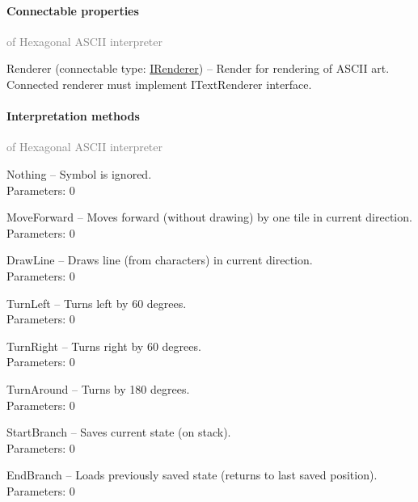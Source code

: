 	\paragraph{Connectable properties}\textcolor{gray}{of Hexagonal ASCII interpreter}
	\begin{description*}
		\item[Renderer]
		(connectable type:  \hyperref[Malsys.Processing.Components.IRenderer]{IRenderer})
			-- Render for rendering of ASCII art.
            Connected renderer must implement ITextRenderer interface.
	\end{description*}
	\paragraph{Interpretation methods}\textcolor{gray}{of Hexagonal ASCII interpreter}
	\begin{description*}
		\item[Nothing]
			-- Symbol is ignored.
		\\ Parameters: 0 
		\item[MoveForward]
			-- Moves forward (without drawing) by one tile in current direction.
		\\ Parameters: 0 
		\item[DrawLine]
			-- Draws line (from characters) in current direction.
		\\ Parameters: 0 
		\item[TurnLeft]
			-- Turns left by 60 degrees.
		\\ Parameters: 0 
		\item[TurnRight]
			-- Turns right by 60 degrees.
		\\ Parameters: 0 
		\item[TurnAround]
			-- Turns by 180 degrees.
		\\ Parameters: 0 
		\item[StartBranch]
			-- Saves current state (on stack).
		\\ Parameters: 0 
		\item[EndBranch]
			-- Loads previously saved state (returns to last saved position).
		\\ Parameters: 0 
	\end{description*}
	


